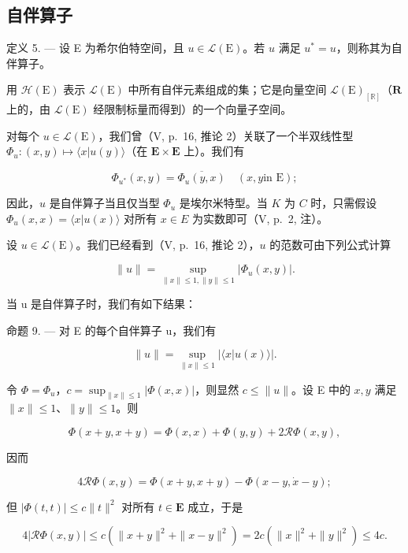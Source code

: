 \subsection{自伴算子}

定义 5. --- 设 E 为希尔伯特空间，且 \(u \in \mathcal{L}(\mathrm{E})\)。若 \(u\) 满足 \(u^* = u\)，则称其为自伴算子。

用 \(\mathcal{H}(\mathrm{E})\) 表示 \(\mathcal{L}(\mathrm{E})\) 中所有自伴元素组成的集；它是向量空间 \(\mathcal{L}(\mathrm{E})_{[\mathbb{R}]}\)（\(\mathbf{R}\) 上的，由 \(\mathcal{L}(\mathrm{E})\) 经限制标量而得到）的一个向量子空间。

对每个 \(u \in \mathcal{L}(\mathrm{E})\)，我们曾（V, p.~16, 推论 2）关联了一个半双线性型 \(\Phi_u : (x, y) \mapsto \langle x | u(y) \rangle\)（在 \(\mathbf{E} \times \mathbf{E}\) 上）。我们有

\[
\Phi_ {u ^ {*}} (x, y) = \overline {{{{\Phi_ {u} (y , x)}}}} \quad (x, y \text {in E});\tag{14}
\]

因此，\(u\) 是自伴算子当且仅当型 \(\Phi_u\) 是埃尔米特型。当 \(K\) 为 \(C\) 时，只需假设 \(\Phi_u(x, x) = \langle x | u(x) \rangle\) 对所有 \(x \in E\) 为实数即可（V, p.~2, 注）。

设 \(u \in \mathcal{L}(\mathrm{E})\)。我们已经看到（V, p.~16, 推论 2），\(u\) 的范数可由下列公式计算

\[
\| u \| = \sup _ {\| x \| \leqslant 1, \| y \| \leqslant 1} \left| \Phi_ {u} (x, y) \right|.\tag{15}
\]

当 u 是自伴算子时，我们有如下结果：

命题 9. --- 对 E 的每个自伴算子 u，我们有

\[
\| u \| = \sup _ {\| x \| \leqslant 1} | \langle x | u (x) \rangle |.\tag{16}
\]

令 \(\Phi = \Phi_{u}\)，\(c = \sup_{\| x\| \leqslant 1}|\Phi (x,x)|\)，则显然 \(c\leqslant \| u\|\)。设 E 中的 \(x,y\) 满足 \(\| x\| \leqslant 1\)、\(\| y\| \leqslant 1\)。则

\[
\Phi (x + y, x + y) = \Phi (x, x) + \Phi (y, y) + 2 \mathscr {R} \Phi (x, y),
\]

因而

\[
4 \mathscr {R} \Phi (x, y) = \Phi (x + y, x + y) - \Phi (x - y, \dot {x} - y);
\]

但 \(|\Phi(t, t)| \leqslant c \|t\|^2\) 对所有 \(t \in \mathbf{E}\) 成立，于是

\[
4 \left| \mathcal {R} \Phi (x, y) \right| \leqslant c \left(\| x + y \| ^ {2} + \| x - y \| ^ {2}\right) = 2 c \left(\| x \| ^ {2} + \| y \| ^ {2}\right) \leqslant 4 c.
\]

